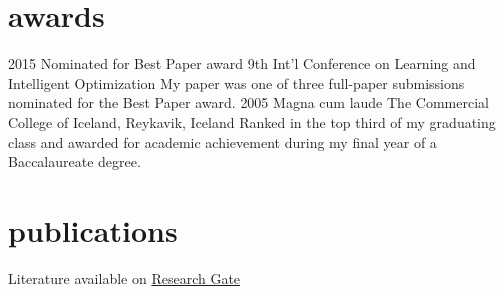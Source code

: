 \documentclass[]{cv} %
\begin{document}
\section{awards}
\begin{entrylist}
	\entry
	{2015}
	{Nominated for Best Paper award}
	{9th Int'l Conference on Learning and Intelligent Optimization}
	{My paper  was one of three full-paper submissions nominated for the Best Paper award.}
	\entry
	{2005}
	{Magna cum laude}
	{The Commercial College of Iceland, Reykavik, Iceland}
	{Ranked in the top third of my graduating class and awarded for academic achievement during my final year of a Baccalaureate degree.}
\end{entrylist}

\section{publications}

{Literature available on 
\href{https://www.researchgate.net/profile/Helga_Ingimundardottir}{{\boldfont 
Research Gate}}}
\nocite{*}

\printbibliography[type=misc, title={seminars}, heading=subbibliography]


\end{document}
